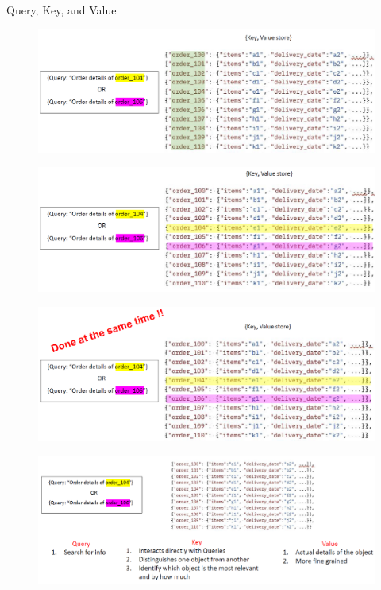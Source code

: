 \begin{frame}[allowframebreaks]{Query, Key, and Value}
    \begin{figure}
        \centering
        \includegraphics[width=\linewidth, height=0.9\textheight,keepaspectratio]{images/nlp/query-key-value.png}
    \end{figure}

    \framebreak
    \begin{figure}
        \centering
        \includegraphics[width=\linewidth, height=0.9\textheight,keepaspectratio]{images/nlp/query-key-value-2.png}
    \end{figure}

    \framebreak
    \begin{figure}
        \centering
        \includegraphics[width=\linewidth, height=0.9\textheight,keepaspectratio]{images/nlp/query-key-value-3.png}
    \end{figure}

    \framebreak
    \begin{figure}
        \centering
        \includegraphics[width=\linewidth, height=0.9\textheight,keepaspectratio]{images/nlp/query-key-value-4.png}
    \end{figure}
\end{frame}

